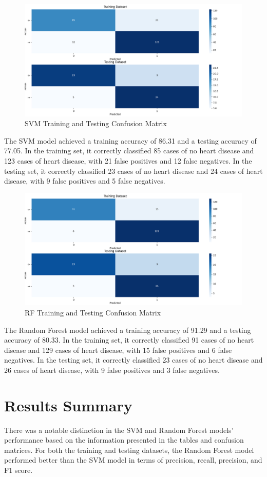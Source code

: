 \begin{figure}[H]
    \centering
    \includegraphics[width=1.0\textwidth]{figures/svm_CM.png}
    \caption{SVM Training and Testing Confusion Matrix}
    \label{fig:svm_cm}
\end{figure}
The SVM model achieved a training accuracy of 86.31 and a testing accuracy of 77.05. In the training set, it correctly classified 85 cases of no heart disease and 123 cases of heart disease, with 21 false positives and 12 false negatives. In the testing set, it correctly classified 23 cases of no heart disease and 24 cases of heart disease, with 9 false positives and 5 false negatives.

\begin{figure}[H]
    \centering
    \includegraphics[width=1.0\textwidth]{figures/RF_CM.png}
    \caption{RF Training and Testing Confusion Matrix}
    \label{fig:rf_cm}
\end{figure}
The Random Forest model achieved a training accuracy of 91.29 and a testing accuracy of 80.33. In the training set, it correctly classified 91 cases of no heart disease and 129 cases of heart disease, with 15 false positives and 6 false negatives. In the testing set, it correctly classified 23 cases of no heart disease and 26 cases of heart disease, with 9 false positives and 3 false negatives.

\section{Results Summary}

There was a notable distinction in the SVM and Random Forest models' performance based on the information presented in the tables and confusion matrices. For both the training and testing datasets, the Random Forest model performed better than the SVM model in terms of precision, recall, precision, and F1 score.
